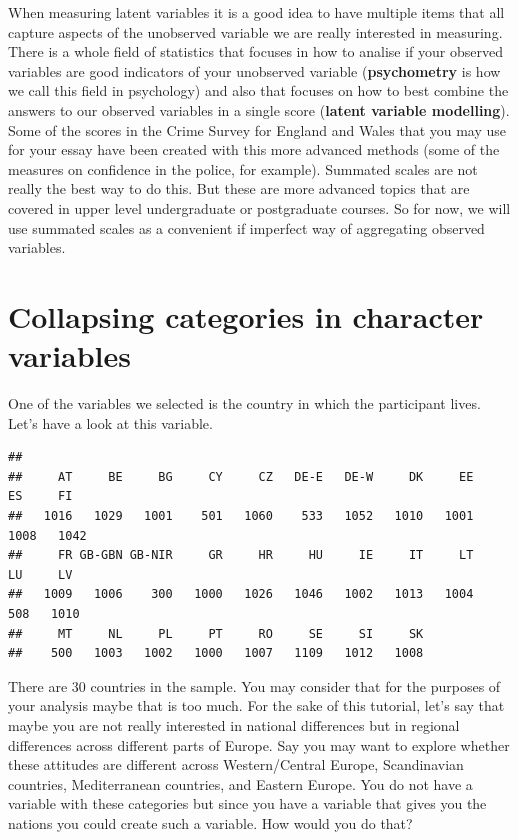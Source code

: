 \documentclass[
]{book}
\newenvironment{Shaded}{\begin{snugshade}}{\end{snugshade}}
\newcommand{\FunctionTok}[1]{\textcolor[rgb]{0.00,0.00,0.00}{#1}}
\newcommand{\NormalTok}[1]{#1}
\newcommand{\SpecialCharTok}[1]{\textcolor[rgb]{0.00,0.00,0.00}{#1}}
\begin{document}
When measuring latent variables it is a good idea to have multiple items that all capture aspects of the unobserved variable we are really interested in measuring. There is a whole field of statistics that focuses in how to analise if your observed variables are good indicators of your unobserved variable (\textbf{psychometry} is how we call this field in psychology) and also that focuses on how to best combine the answers to our observed variables in a single score (\textbf{latent variable modelling}). Some of the scores in the Crime Survey for England and Wales that you may use for your essay have been created with this more advanced methods (some of the measures on confidence in the police, for example). Summated scales are not really the best way to do this. But these are more advanced topics that are covered in upper level undergraduate or postgraduate courses. So for now, we will use summated scales as a convenient if imperfect way of aggregating observed variables.

\hypertarget{collapsing-categories-in-character-variables}{%
\section{Collapsing categories in character variables}\label{collapsing-categories-in-character-variables}}

One of the variables we selected is the country in which the participant lives. Let's have a look at this variable.

\begin{Shaded}
\end{Shaded}

\begin{verbatim}
## 
##     AT     BE     BG     CY     CZ   DE-E   DE-W     DK     EE     ES     FI 
##   1016   1029   1001    501   1060    533   1052   1010   1001   1008   1042 
##     FR GB-GBN GB-NIR     GR     HR     HU     IE     IT     LT     LU     LV 
##   1009   1006    300   1000   1026   1046   1002   1013   1004    508   1010 
##     MT     NL     PL     PT     RO     SE     SI     SK 
##    500   1003   1002   1000   1007   1109   1012   1008
\end{verbatim}

There are 30 countries in the sample. You may consider that for the purposes of your analysis maybe that is too much. For the sake of this tutorial, let's say that maybe you are not really interested in national differences but in regional differences across different parts of Europe. Say you may want to explore whether these attitudes are different across Western/Central Europe, Scandinavian countries, Mediterranean countries, and Eastern Europe. You do not have a variable with these categories but since you have a variable that gives you the nations you could create such a variable. How would you do that?
\end{document}
